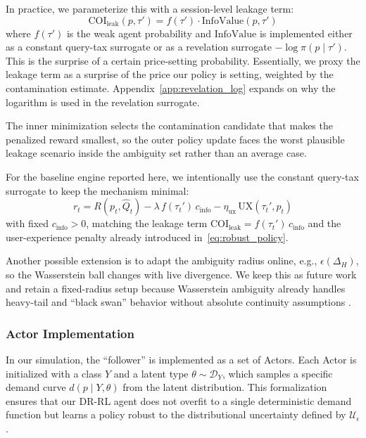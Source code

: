 In practice, we parameterize this with a session-level leakage term:
\begin{equation}
\text{COI}_{\text{leak}}(p,\tau') = f(\tau')\cdot \text{InfoValue}(p,\tau')
\end{equation}
where $f(\tau')$ is the weak agent probability and $\text{InfoValue}$ is implemented either as a constant query-tax surrogate or as a revelation surrogate $-\log\pi(p\mid\tau')$. This is the surprise of a certain price-setting probability. Essentially, we proxy the leakage term as a surprise of the price our policy is setting, weighted by the contamination estimate. Appendix~\ref{app:revelation_log} expands on why the logarithm is used in the revelation surrogate.

The inner minimization selects the contamination candidate that makes the penalized reward smallest, so the outer policy update faces the worst plausible leakage scenario inside the ambiguity set rather than an average case.

For the baseline engine reported here, we intentionally use the constant query-tax surrogate to keep the mechanism minimal:
\begin{equation}
\label{eq:baseline_step_reward}
r_t = R\!\left(p_t,\hat{Q}_t\right) - \lambda\,f(\tau_t')\,c_{\text{info}} - \eta_{\text{ux}}\,\text{UX}(\tau_t', p_t)
\end{equation}
with fixed $c_{\text{info}}>0$, matching the leakage term $\text{COI}_{\text{leak}}=f(\tau_t')\,c_{\text{info}}$ and the user-experience penalty already introduced in~\eqref{eq:robust_policy}.


Another possible extension is to adapt the ambiguity radius online, e.g., $\epsilon(\Delta_H)$, so the Wasserstein ball changes with live divergence. We keep this as future work and retain a fixed-radius setup because Wasserstein ambiguity already handles heavy-tail and ``black swan'' behavior without absolute continuity assumptions \parencite{kuhn_wasserstein_2024}.

\subsubsection{Actor Implementation}
In our simulation, the ``follower'' is implemented as a set of Actors. Each Actor is initialized with a class $Y$ and a latent type $\theta \sim \mathcal{D}_Y$, which samples a specific demand curve $d\!\left(p\mid Y,\theta\right)$ from the latent distribution. This formalization ensures that our DR-RL agent does not overfit to a single deterministic demand function but learns a policy robust to the distributional uncertainty defined by $\mathcal{U}_\epsilon$.

